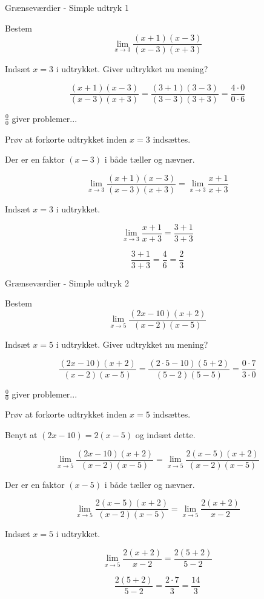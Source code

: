 \documentclass{article}
\begin{document}
\tableofcontents
\newpage

\begin{exercise}{Grænseværdier - Simple udtryk 1}

Bestem 
\[
\lim_{x \to 3} \frac{(x+1)(x-3)}{(x-3)(x+3)}
\]


\hint
Indsæt $x=3$ i udtrykket. Giver udtrykket nu mening?

\hint
\[
\frac{(x+1)(x-3)}{(x-3)(x+3)} = \frac{(3+1)(3-3)}{(3-3)(3+3)} = \frac{4 \cdot 0}{0 \cdot 6}
\]

\hint
$\frac{0}{0}$ giver problemer...

\hint
Prøv at forkorte udtrykket inden $x=3$ indsættes.

\hint
Der er en faktor $(x-3)$ i både tæller og nævner.

\hint
\[
\lim_{x \to 3} \frac{(x+1)(x-3)}{(x-3)(x+3)} = \lim_{x \to 3} \frac{x+1}{x+3}
\]

\hint
Indsæt $x=3$ i udtrykket.

\hint
\[
\lim_{x \to 3} \frac{x+1}{x+3} = \frac{3+1}{3+3}
\]

\hint
\[
\frac{3+1}{3+3} = \frac{4}{6} = \frac{2}{3}
\]


\end{exercise}

\newpage
\begin{exercise}{Grænseværdier - Simple udtryk 2}
	
	Bestem 
	\[
	\lim_{x \to 5} \frac{(2x-10)(x+2)}{(x-2)(x-5)}
	\]
	
	
	\hint
	Indsæt $x=5$ i udtrykket. Giver udtrykket nu mening?
	
	\hint
	\[
	\frac{(2x-10)(x+2)}{(x-2)(x-5)} = \frac{(2 \cdot 5-10)(5+2)}{(5-2)(5-5)} = \frac{0 \cdot 7}{3 \cdot 0}
	\]
	
	\hint
	$\frac{0}{0}$ giver problemer...
	
	\hint
	Prøv at forkorte udtrykket inden $x=5$ indsættes.
	
	\hint
	Benyt at $(2x-10) = 2 (x-5)$ og indsæt dette.
	
	\hint
	\[
	\lim_{x \to 5} \frac{(2x-10)(x+2)}{(x-2)(x-5)} = \lim_{x \to 5} \frac{2(x-5)(x+2)}{(x-2)(x-5)}
	\]
	
	\hint
	Der er en faktor $(x-5)$ i både tæller og nævner.
	
	\hint
	\[
	\lim_{x \to 5} \frac{2(x-5)(x+2)}{(x-2)(x-5)} = \lim_{x \to 5} \frac{2(x+2)}{x-2}
	\]
	
	\hint
	Indsæt $x=5$ i udtrykket.
	
	\hint
	\[
	 \lim_{x \to 5} \frac{2(x+2)}{x-2} = \frac{2(5+2)}{5-2} 
	\]
	
	\hint
	\[
	 \frac{2(5+2)}{5-2} = \frac{2 \cdot 7}{3} = \frac{14}{3}
	\]
	
	
\end{exercise}
\end{document}
